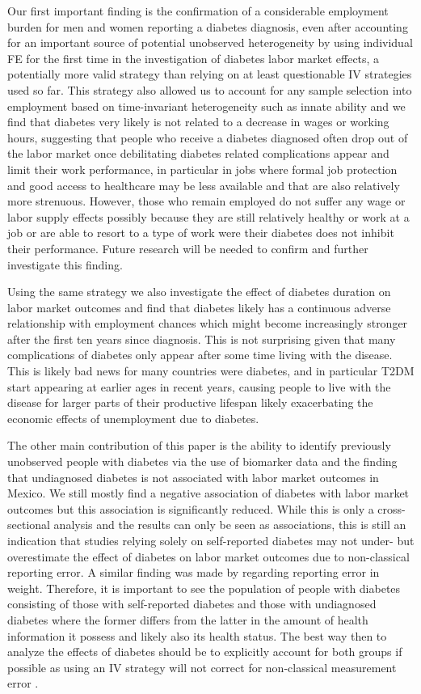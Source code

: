 \documentclass[12pt,english,british]{article}
\begin{document}
Our first important finding is the confirmation of a considerable employment burden for men and women reporting a diabetes diagnosis, even after accounting for an important source of potential unobserved heterogeneity by using individual \ac{FE} for the first time in the investigation of diabetes labor market effects, a potentially more valid strategy than relying on at least questionable \ac{IV} strategies used so far. This strategy also allowed us to account for any sample selection into employment based on time-invariant heterogeneity such as innate ability and we find that diabetes very likely is not related to a decrease in wages or working hours, suggesting that people who receive a diabetes diagnosed often drop out of the labor market once debilitating diabetes related complications appear and limit their work performance, in particular in jobs where formal job protection and good access to healthcare may be less available and that are also relatively more strenuous. However, those who remain employed do not suffer any wage or labor supply effects possibly  because they are still relatively healthy or work at a job or are able to resort to a type of work were their diabetes does not inhibit their performance. Future research will be needed to confirm and further investigate this finding.

Using the same strategy we also investigate the effect of diabetes duration on labor market outcomes and find that diabetes likely has a continuous adverse relationship with employment chances which might become increasingly stronger after the first ten years since diagnosis. This is not surprising given that many complications of diabetes only appear after some time living with the disease. This is likely bad news for many countries were diabetes, and in particular \ac{T2DM} start appearing at earlier ages in recent years, causing people to live with the disease for larger parts of their productive lifespan likely exacerbating the economic effects of unemployment due to diabetes. 

The other main contribution of this paper is the ability to identify previously unobserved people with diabetes via the use of biomarker data and the finding that undiagnosed
diabetes is not associated with labor market outcomes in Mexico. We still mostly find a negative association of diabetes with labor market outcomes but this association is significantly reduced. While this is only a cross-sectional analysis and the results can only be seen as associations, this is still an indication that studies relying solely on self-reported diabetes may not under- but overestimate the effect of diabetes on labor market outcomes due to non-classical reporting error. A similar finding was made by \citet{Cawley2015} regarding reporting error in weight. Therefore, it is important to see the population of people with diabetes consisting of those with self-reported diabetes and those with undiagnosed diabetes where the former differs from the latter in the amount of health information it possess and likely also its health status. The best way then to analyze the effects of diabetes should be to explicitly account for both groups if possible as using an \ac{IV} strategy will not correct for non-classical measurement error \citep{Cawley2015}.
\end{document}

